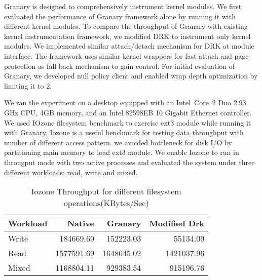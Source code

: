 Granary is designed to comprehensively instrument kernel modules. We first evaluated the performance of Granary framework alone by running it with different kernel modules. To compare the throughput of Granary with existing kernel instrumentation framework, we modified DRK to instrument only kernel modules. We implemented similar attach/detach mechanism for DRK at module interface. The framework uses similar kernel wrappers for fast attach and page protection as fall back mechanism to gain control. For initial evaluation of Granary, we developed null policy client and enabled wrap depth optimization by limiting it to 2. 

We ran the experiment on a desktop equipped with an Intel\textregistered\ Core\texttrademark\ 2 Duo 2.93 GHz CPU, 4GB memory, and an Intel 82598EB 10 Gigabit Ethernet controller. We used IOzone filesystem benchmark to exercise ext3 module while running it with Granary. Iozone is a useful benchmark for testing data throughput with number of different access pattern. we avoided bottleneck for disk I/O by partitioning main memory to load ext3 module. We enable Iozone to run in througput mode with two active processes and evaluated the system under three different workloads: read, write and mixed.


\begin{table}[thp!]
\caption{Iozone Throughput for different filesystem operations(KBytes/Sec)}
\centering
\begin{tabular}{l r r r}
\hline\hline
Workload & Native & Granary & Modified Drk  \\ [0.5ex]
\hline
Write & 184669.69 & 152223.03 & 55134.09 \\
Read & 1577591.69 & 1648645.02 & 1421037.96 \\

Mixed & 1168804.11 & 929383.54 & 915196.76 \\[1ex]
\hline
\end{tabular}
\label{table:nonlin}
\end{table}


